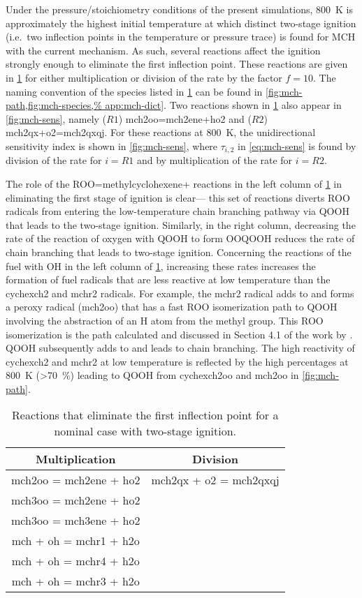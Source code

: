 \documentclass[../main.tex]{subfiles}
\begin{document}
Under the pressure/stoichiometry conditions of the present simulations, \SI{800}{\kelvin}
is approximately the highest initial temperature at which distinct two-stage
ignition (i.e.\ two inflection points in the temperature or pressure trace) is
found for MCH with the current mechanism. As such, several reactions affect
the ignition strongly enough to eliminate the first inflection point. These
reactions are given in \cref{tab:mch-sens} for either multiplication or
division of the rate by the factor $f=10$. The naming convention of the species
listed in \cref{tab:mch-sens} can be found in \cref{fig:mch-path,fig:mch-species,%
app:mch-dict}. Two reactions shown in
\cref{tab:mch-sens} also appear in \cref{fig:mch-sens}, namely ($R1$)
mch2oo=mch2ene+ho2 and ($R2$) mch2qx+o2=mch2qxqj. For these reactions at \SI{800}{\kelvin},
the unidirectional sensitivity index is shown in \cref{fig:mch-sens}, where $\tau_{i,2}$
in \cref{eq:mch-sens} is found by division of the rate for $i=R1$ and by
multiplication of the rate for $i=R2$.

The role of the ROO=methylcyclohexene+ reactions in the left column of
\cref{tab:mch-sens} in eliminating the first stage of ignition is clear---%
this set of reactions diverts ROO radicals from entering the low-temperature
chain branching pathway via QOOH that leads to the two-stage ignition.
Similarly, in the right column, decreasing the rate of the reaction of oxygen
with QOOH to form OOQOOH reduces the rate of chain branching that leads to
two-stage ignition. Concerning the reactions of the fuel with OH in the left
column of \cref{tab:mch-sens}, increasing these rates increases the
formation of fuel radicals that are less reactive at low temperature than the
cychexch2 and mchr2 radicals. For example, the mchr2 radical adds to  and
forms a peroxy radical (mch2oo) that has a fast ROO isomerization path to QOOH
involving the abstraction of an H atom from the methyl group. This ROO
isomerization is the path calculated and discussed in Section 4.1 of the work by
\textcite{Weber2014}. QOOH subsequently adds to  and leads to chain branching.
The high reactivity of cychexch2 and mchr2 at low temperature is reflected by
the high percentages at \SI{800}{\kelvin} (>\SI{70}{\percent}) leading to QOOH from cychexch2oo and
mch2oo in \cref{fig:mch-path}.

\begin{table}
    \caption{Reactions that eliminate the first inflection point for a nominal
    case with two-stage ignition.}
    \label{tab:mch-sens}
    \begin{tabular}{c c}
    \toprule
    Multiplication & Division \\
    \midrule
    mch2oo = mch2ene + ho2 & mch2qx + o2 = mch2qxqj \\
    mch3oo = mch2ene + ho2 & \\
    mch3oo = mch3ene + ho2 & \\
    mch + oh = mchr1 + h2o & \\
    mch + oh = mchr4 + h2o & \\
    mch + oh = mchr3 + h2o & \\
    \bottomrule
    \end{tabular}
\end{table}
\end{document}
